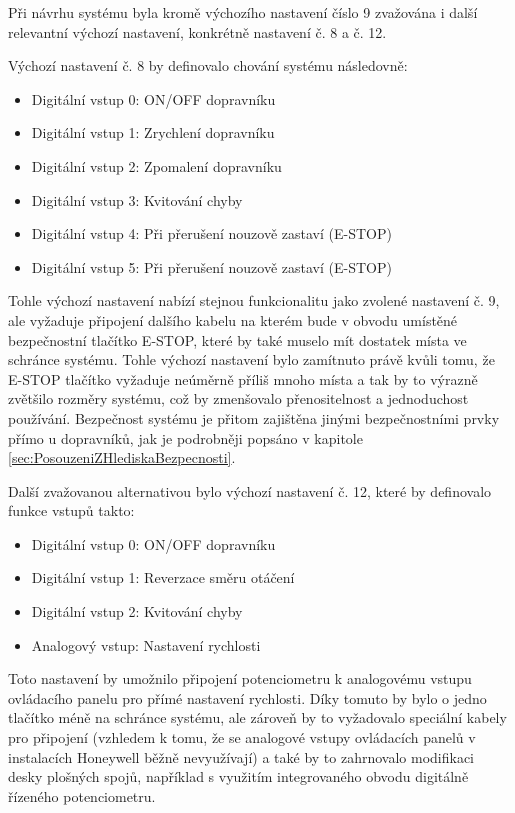 Při návrhu systému byla kromě výchozího nastavení číslo 9 zvažována i další relevantní výchozí nastavení, konkrétně nastavení č. 8 a č. 12.

Výchozí nastavení č. 8 by definovalo chování systému následovně:
\begin{itemize}
	\item Digitální vstup 0: ON/OFF dopravníku
	\item Digitální vstup 1: Zrychlení dopravníku
	\item Digitální vstup 2: Zpomalení dopravníku
	\item Digitální vstup 3: Kvitování chyby
	\item Digitální vstup 4: Při přerušení nouzově zastaví (E-STOP)
	\item Digitální vstup 5: Při přerušení nouzově zastaví (E-STOP)
\end{itemize}
Tohle výchozí nastavení nabízí stejnou funkcionalitu jako zvolené nastavení č. 9, ale vyžaduje připojení dalšího kabelu na kterém bude v obvodu umístěné bezpečnostní tlačítko E-STOP, které by také muselo mít dostatek místa ve schránce systému. Tohle výchozí nastavení bylo zamítnuto právě kvůli tomu, že E-STOP tlačítko vyžaduje neúměrně příliš mnoho místa a tak by to výrazně zvětšilo rozměry systému, což by zmenšovalo přenositelnost a jednoduchost používání. Bezpečnost systému je přitom zajištěna jinými bezpečnostními prvky přímo u dopravníků, jak je podrobněji popsáno v kapitole \ref{sec:PosouzeniZHlediskaBezpecnosti}.
\cite{SiemensG120DGettingStarted}

Další zvažovanou alternativou bylo výchozí nastavení č. 12, které by definovalo funkce vstupů takto:
\begin{itemize}
	\item Digitální vstup 0: ON/OFF dopravníku
	\item Digitální vstup 1: Reverzace směru otáčení
	\item Digitální vstup 2: Kvitování chyby
	\item Analogový vstup: Nastavení rychlosti
\end{itemize}
Toto nastavení by umožnilo připojení potenciometru k analogovému vstupu ovládacího panelu pro přímé nastavení rychlosti. Díky tomuto by bylo o jedno tlačítko méně na schránce systému, ale zároveň by to vyžadovalo speciální kabely pro připojení (vzhledem k tomu, že se analogové vstupy ovládacích panelů v instalacích Honeywell běžně nevyužívají) a také by to zahrnovalo modifikaci desky plošných spojů, například s využitím integrovaného obvodu digitálně řízeného potenciometru.
\cite{SiemensG120DGettingStarted}

